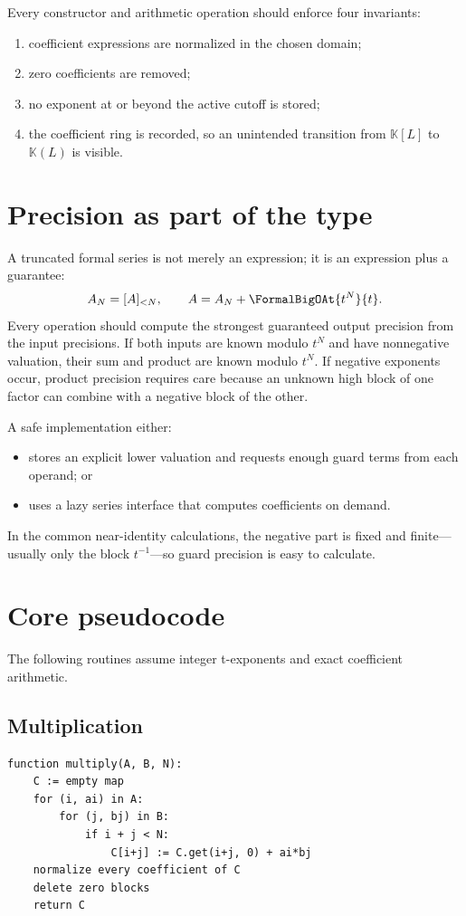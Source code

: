 \documentclass[11pt,openany]{book}
\theoremstyle{definition}
\theoremstyle{plain}
\theoremstyle{remark}
\newcommand{\K}{\mathbb{K}}
\begin{document}
Every constructor and arithmetic operation should enforce four invariants:
\begin{enumerate}
\item coefficient expressions are normalized in the chosen domain;
\item zero coefficients are removed;
\item no exponent at or beyond the active cutoff is stored;
\item the coefficient ring is recorded, so an unintended transition from
      \(\K[L]\) to \(\K(L)\) is visible.
\end{enumerate}

\section{Precision as part of the type}
A truncated formal series is not merely an expression; it is an expression plus
a guarantee:
\[
 A_N=[A]_{<N},
 \qquad A=A_N+\FormalBigOAt{t^N}{t}.
\]
Every operation should compute the strongest guaranteed output precision from
the input precisions.  If both inputs are known modulo \(t^N\) and have
nonnegative valuation, their sum and product are known modulo \(t^N\).  If
negative exponents occur, product precision requires care because an unknown
high block of one factor can combine with a negative block of the other.

A safe implementation either:
\begin{itemize}
\item stores an explicit lower valuation and requests enough guard terms from
      each operand; or
\item uses a lazy series interface that computes coefficients on demand.
\end{itemize}
In the common near-identity calculations, the negative part is fixed and
finite---usually only the block \(t^{-1}\)---so guard precision is easy to
calculate.

\section{Core pseudocode}
The following routines assume integer t-exponents and exact coefficient
arithmetic.

\subsection{Multiplication}
\begin{lstlisting}[style=pseudostyle]
function multiply(A, B, N):
    C := empty map
    for (i, ai) in A:
        for (j, bj) in B:
            if i + j < N:
                C[i+j] := C.get(i+j, 0) + ai*bj
    normalize every coefficient of C
    delete zero blocks
    return C
\end{lstlisting}
\end{document}

